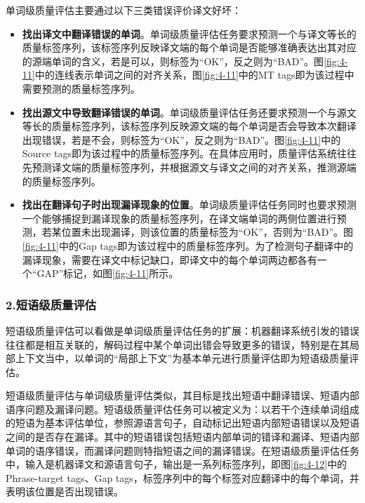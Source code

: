\parinterval 单词级质量评估主要通过以下三类错误评价译文好坏：

\begin{itemize}
\vspace{0.5em}
\item {\small\sffamily\bfseries{找出译文中翻译错误的单词}}。单词级质量评估任务要求预测一个与译文等长的质量标签序列，该标签序列反映译文端的每个单词是否能够准确表达出其对应的源端单词的含义，若是可以，则标签为“OK”，反之则为“BAD”。图\ref{fig:4-11}中的连线表示单词之间的对齐关系，图\ref{fig:4-11}中的MT tags即为该过程中需要预测的质量标签序列。
\vspace{0.5em}
\item {\small\sffamily\bfseries{找出源文中导致翻译错误的单词}}。单词级质量评估任务还要求预测一个与源文等长的质量标签序列，该标签序列反映源文端的每个单词是否会导致本次翻译出现错误，若是不会，则标签为“OK”，反之则为“BAD”。图\ref{fig:4-11}中的Source tags即为该过程中的质量标签序列。在具体应用时，质量评估系统往往先预测译文端的质量标签序列，并根据源文与译文之间的对齐关系，推测源端的质量标签序列。
\vspace{0.5em}
\item {\small\sffamily\bfseries{找出在翻译句子时出现漏译现象的位置}}。单词级质量评估任务同时也要求预测一个能够捕捉到漏译现象的质量标签序列，在译文端单词的两侧位置进行预测，若某位置未出现漏译，则该位置的质量标签为“OK”，否则为“BAD”。图\ref{fig:4-11}中的Gap tags即为该过程中的质量标签序列。为了检测句子翻译中的漏译现象，需要在译文中标记缺口，即译文中的每个单词两边都各有一个“GAP”标记，如图\ref{fig:4-11}所示。
\vspace{0.5em}
\end{itemize}


\subsubsection{2.短语级质量评估}

\parinterval 短语级质量评估可以看做是单词级质量评估任务的扩展：机器翻译系统引发的错误往往都是相互关联的，解码过程中某个单词出错会导致更多的错误，特别是在其局部上下文当中，以单词的“局部上下文”为基本单元进行质量评估即为短语级质量评估。

\parinterval 短语级质量评估与单词级质量评估类似，其目标是找出短语中翻译错误、短语内部语序问题及漏译问题。短语级质量评估任务可以被定义为：以若干个连续单词组成的短语为基本评估单位，参照源语言句子，自动标记出短语内部短语错误以及短语之间的是否存在漏译。其中的短语错误包括短语内部单词的错译和漏译、短语内部单词的语序错误，而漏译问题则特指短语之间的漏译错误。在短语级质量评估任务中，输入是机器译文和源语言句子，输出是一系列标签序列，即图\ref{fig:4-12}中的Phrase-target tags、Gap tags，标签序列中的每个标签对应翻译中的每个单词，并表明该位置是否出现错误。

